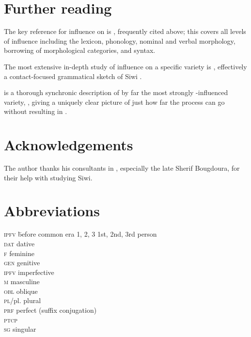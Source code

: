 \documentclass[output=paper]{langsci/langscibook}
\begin{document}
\section*{Further reading}

The key reference for  influence on   is \citet{Kossmann2012}, frequently cited above; this covers all levels of influence including the lexicon, phonology, nominal and verbal morphology, borrowing of morphological categories, and syntax.
\largerpage

The most extensive in-depth study of  influence on a specific  variety is \citet{Souag2013book}, effectively a contact-focused grammatical sketch of Siwi .

\citet{Mourigh2016} is a thorough synchronic description of by far the most strongly -influenced  variety, , giving a uniquely clear picture of just how far the process can go without resulting in .

\section*{Acknowledgements}

The author thanks his consultants in , especially the late Sherif Bougdoura, for their help with studying Siwi.

\section*{Abbreviations}
\begin{multicols}{2}
\begin{tabbing}
\textsc{ipfv} \hspace{1em} \= before common era\kill
\textsc{1, 2, 3} \> 1st, 2nd, 3rd person \\
\textsc{dat} \> dative \\
\textsc{f} \> feminine \\
\textsc{gen} \> genitive \\
\textsc{ipfv} \> imperfective  \\
\textsc{m} \> masculine \\
\textsc{obl} \> oblique \\
\textsc{pl}/pl. \> plural \\
\textsc{prf} \> perfect (suffix conjugation) \\
\textsc{ptcp} \>  \\
\textsc{sg} \> singular
\end{tabbing}
\end{multicols}

\sloppy
\printbibliography[heading=subbibliography,notkeyword=this]
\end{document}
